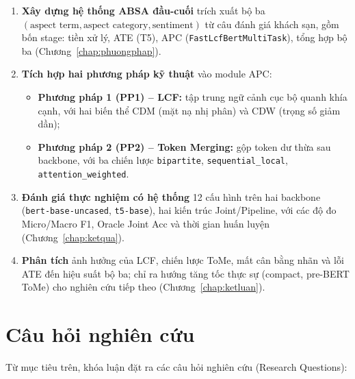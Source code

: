 \begin{enumerate}
  \item \textbf{Xây dựng hệ thống ABSA đầu-cuối} trích xuất bộ ba
        \((\text{aspect term}, \text{aspect category}, \text{sentiment})\) từ câu đánh
        giá khách sạn, gồm bốn stage: tiền xử lý, ATE (T5), APC
        (\texttt{FastLcfBertMultiTask}), tổng hợp bộ ba (Chương~\ref{chap:phuongphap}).

  \item \textbf{Tích hợp hai phương pháp kỹ thuật} vào module APC:
        \begin{itemize}
          \item \textbf{Phương pháp 1 (PP1) -- LCF:} tập trung ngữ cảnh cục bộ quanh khía
                cạnh, với hai biến thể CDM (mặt nạ nhị phân) và CDW (trọng số giảm dần);
          \item \textbf{Phương pháp 2 (PP2) -- Token Merging:} gộp token dư thừa sau
                backbone, với ba chiến lược \texttt{bipartite}, \texttt{sequential\_local},
                \texttt{attention\_weighted}.
        \end{itemize}

  \item \textbf{Đánh giá thực nghiệm có hệ thống} 12 cấu hình trên hai backbone
        (\texttt{bert-base-uncased}, \texttt{t5-base}), hai kiến trúc Joint/Pipeline,
        với các độ đo Micro/Macro F1, Oracle Joint Acc và thời gian huấn luyện
        (Chương~\ref{chap:ketqua}).

  \item \textbf{Phân tích} ảnh hưởng của LCF, chiến lược ToMe, mất cân bằng nhãn và lỗi
        ATE đến hiệu suất bộ ba; chỉ ra hướng tăng tốc thực sự (compact, pre-BERT ToMe)
        cho nghiên cứu tiếp theo (Chương~\ref{chap:ketluan}).
\end{enumerate}

\section{Câu hỏi nghiên cứu}
\label{sec:gt_cauhoi}

Từ mục tiêu trên, khóa luận đặt ra các câu hỏi nghiên cứu (Research Questions):

